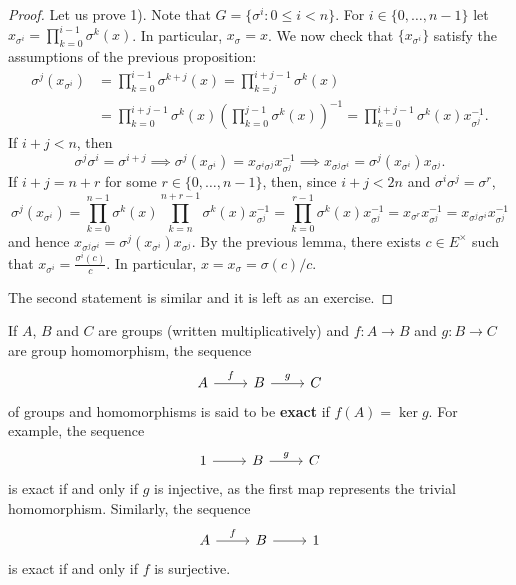 \begin{proof}
    Let us prove 1). Note that $G=\{\sigma^i:0\leq i<n\}$. For $i\in\{0,\dots,n-1\}$ let 
    $x_{\sigma^i}=\prod_{k=0}^{i-1}\sigma^k(x)$. In particular, $x_{\sigma}=x$. We now
    check that $\{x_{\sigma^i}\}$ satisfy the assumptions of the previous proposition:
    \begin{align*}
        \sigma^j(x_{\sigma^i}) &= \prod_{k=0}^{i-1}\sigma^{k+j}(x)
        =\prod_{k=j}^{i+j-1}\sigma^k(x)\\
        &=\prod_{k=0}^{i+j-1}\sigma^k(x)\left(\prod_{k=0}^{j-1}\sigma^k(x)\right)^{-1}
        =\prod_{k=0}^{i+j-1}\sigma^k(x)x_{\sigma^j}^{-1}.
    \end{align*}
    If $i+j<n$, then 
    \[
    \sigma^j\sigma^i=\sigma^{i+j}
    \implies
    \sigma^j(x_{\sigma^i})=x_{\sigma^i\sigma^j}x_{\sigma^j}^{-1}
    \implies
    x_{\sigma^j\sigma^i}=\sigma^j(x_{\sigma^i})x_{\sigma^j}.
    \]
    If $i+j=n+r$ for some $r\in\{0,\dots,n-1\}$, then, since $i+j<2n$ and
    $\sigma^i\sigma^j=\sigma^r$, 
    \[
    \sigma^j(x_{\sigma^i})=\prod_{k=0}^{n-1}\sigma^k(x)\prod_{k=n}^{n+r-1}\sigma^k(x)x_{\sigma^j}^{-1}
    =\prod_{k=0}^{r-1}\sigma^k(x)x_{\sigma^j}^{-1}
    =x_{\sigma^r}x_{\sigma^j}^{-1}=x_{\sigma^j\sigma^i}x_{\sigma^j}^{-1}
    \]
    and hence $x_{\sigma^j\sigma^i}=\sigma^j(x_{\sigma^i})x_{\sigma^j}$. By 
    the previous lemma, there exists $c\in E^{\times}$ such that 
    $x_{\sigma^i}=\frac{\sigma^i(c)}{c}$. In particular, $x=x_{\sigma}=\sigma(c)/c$. 
    
    The second statement is similar and it is left as an exercise. 
\end{proof}

If $A$, $B$ and $C$ are groups (written multiplicatively) 
and $f\colon A\to B$ and $g\colon B\to C$ are group homomorphism, 
the sequence 
\[\begin{tikzcd}
	A & B & C 
	\arrow["f", from=1-1, to=1-2]
	\arrow["g", from=1-2, to=1-3]
\end{tikzcd}\]
of groups and homomorphisms 
is said to be \textbf{exact} if $f(A)=\ker g$. 
For example, the sequence 
\[\begin{tikzcd}
	1 & B & C 
	\arrow[from=1-1, to=1-2]
	\arrow["g", from=1-2, to=1-3]
\end{tikzcd}\]
is exact if and only if $g$ is injective, as the first map represents the trivial homomorphism. 
Similarly, the sequence 
\[\begin{tikzcd}
	A & B & 1
	\arrow["f", from=1-1, to=1-2]
	\arrow[from=1-2, to=1-3]
\end{tikzcd}\]
is exact if and only if $f$ is surjective. 

